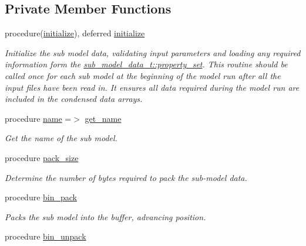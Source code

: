 \subsection*{Private Member Functions}
\begin{DoxyCompactItemize}
\item 
procedure(\mbox{\hyperlink{interfacepmc__sub__model__data_1_1initialize}{initialize}}), deferred \mbox{\hyperlink{structpmc__sub__model__data_1_1sub__model__data__t_a9c2bb91380875b71d9d662f3f9d475f8}{initialize}}
\begin{DoxyCompactList}\small\item\em Initialize the sub model data, validating input parameters and loading any required information form the {\ttfamily \mbox{\hyperlink{structpmc__sub__model__data_1_1sub__model__data__t_aeb00155797966fc95e75ad14d45e7242}{sub\+\_\+model\+\_\+data\+\_\+t\+::property\+\_\+set}}}. This routine should be called once for each sub model at the beginning of the model run after all the input files have been read in. It ensures all data required during the model run are included in the condensed data arrays. \end{DoxyCompactList}\item 
procedure \mbox{\hyperlink{structpmc__sub__model__data_1_1sub__model__data__t_ad7b52c49ba2d2823ed18029df47ad3e7}{name}} =$>$ \mbox{\hyperlink{namespacepmc__sub__model__data_abb4112b25cd30b34833545bda008a983}{get\+\_\+name}}
\begin{DoxyCompactList}\small\item\em Get the name of the sub model. \end{DoxyCompactList}\item 
procedure \mbox{\hyperlink{structpmc__sub__model__data_1_1sub__model__data__t_ad5fe9fdf0b4435052d5b95a7a7e32fc5}{pack\+\_\+size}}
\begin{DoxyCompactList}\small\item\em Determine the number of bytes required to pack the sub-\/model data. \end{DoxyCompactList}\item 
procedure \mbox{\hyperlink{structpmc__sub__model__data_1_1sub__model__data__t_a1957d5f74720ce4ff42598e1507a6bd8}{bin\+\_\+pack}}
\begin{DoxyCompactList}\small\item\em Packs the sub model into the buffer, advancing position. \end{DoxyCompactList}\item 
procedure \mbox{\hyperlink{structpmc__sub__model__data_1_1sub__model__data__t_ac64112c314ccc408971dec18862d2af4}{bin\+\_\+unpack}}

\end{DoxyCompactItemize}
